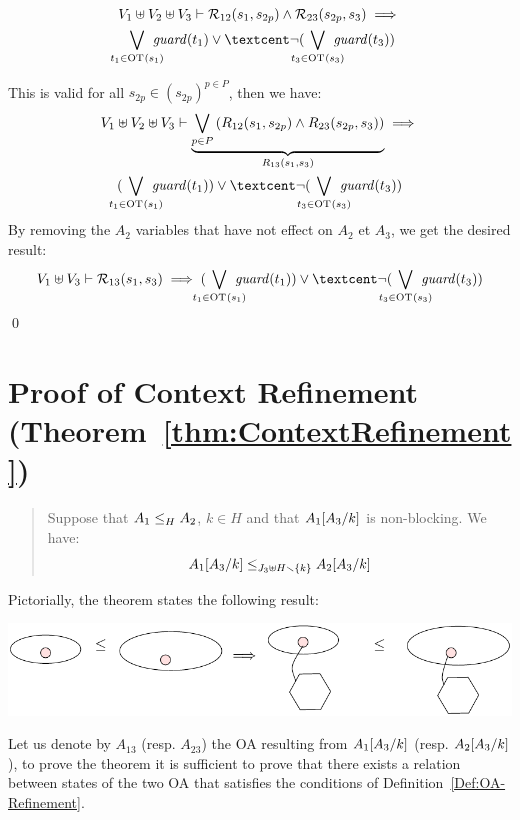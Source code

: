 \documentclass[runningheads]{llncs}
\begin{document}
\begin{enumerate}
\begin{multline*}
 V_1 \uplus V_2 \uplus V_3  \vdash  \mathcal{R}_{12}\mpar{s_1, s_{2p}} \wedge \mathcal{R}_{23}\mpar{s_{2p},s_3} \implies \\
  \bigvee_\subbox{t_1 \in \fOT{s_1}} \fguard{t_1} 
 \lor¢ \lnot( \bigvee_\subbox{t_3 \in \fOT{s_3}} \fguard{t_3} )
\end{multline*}


This is valid for all $s_{2p} \in (s_{2p})^{p\in P}$, then we have:
\begin{multline*}
 V_1 \uplus V_2 \uplus V_3  \vdash \underbrace{\bigvee_{{p\in P}}\mpar{R_{12}\mpar{s_1, s_{2p}} \wedge R_{23}\mpar{s_{2p},s_3}}}_{R_{13}(s_1,s_3)} \implies \\ ( \bigvee_\subbox{t_1 \in \fOT{s_1}} \fguard{t_1} )
 \lor¢ \lnot( \bigvee_\subbox{t_3 \in \fOT{s_3}} \fguard{t_3} )
\end{multline*}
By removing the $A_2$ variables that have not effect on $A_2$ et $A_3$,
we get the desired result:
\begin{multline*}
 V_1 \uplus  V_3  \vdash \mathcal{R}_{13}(s_1,s_3) \implies  ( \bigvee_\subbox{t_1 \in \fOT{s_1}} \fguard{t_1} )
 \lor¢ \lnot( \bigvee_\subbox{t_3 \in \fOT{s_3}} \fguard{t_3} )
\end{multline*}
\qed
\end{enumerate}
\section{Proof of Context Refinement (Theorem~\ref{thm:ContextRefinement})}



\begin{quote}
Suppose that $\wrel{A_1}{A_2}{H}$, \(k \in H\) and that \(A_1\subst{A_3}{k}\) is non-blocking. We have: 
\[\wrel{A_1\subst{A_3}{k}}{A_2\subst{A_3}{k}}{J_3 \uplus H \setminus \mbrc{k}}\]
\end{quote}
\smallskip
Pictorially, the theorem states the following result:

\begin{center}
\includegraphics[scale=0.7]{Figures/Thm2intuition}
\end{center}

\proof
Let us denote by $A_{13}$ (resp. $A_{23}$) the OA resulting from $A_1\subst{A_3}{k}$ (resp. $A_2\subst{A_3}{k}$),  to prove the theorem it is sufficient to prove that there exists a relation between states of the two OA that satisfies the conditions of  Definition~\ref{Def:OA-Refinement}. 
\end{document}
